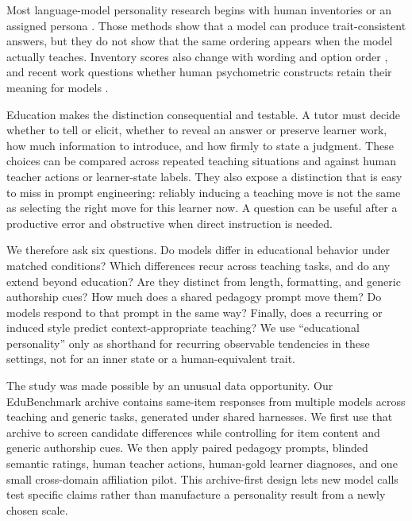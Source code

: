 \documentclass[11pt]{article}
\begin{document}
Most language-model personality research begins with human inventories or an
assigned persona \citep{jiang-etal-2024-personallm,lee-etal-2025-trait}. Those
methods show that a model can produce trait-consistent answers, but they do not
show that the same ordering appears when the model actually teaches. Inventory
scores also change with wording and option order \citep{shu-etal-2024-dont}, and
recent work questions whether human psychometric constructs retain their meaning
for models \citep{han-etal-2025-personality-illusion,zierahn-etal-2026-arent-human,contreras-2026-native-psychometric}.

Education makes the distinction consequential and testable. A tutor must decide
whether to tell or elicit, whether to reveal an answer or preserve learner work,
how much information to introduce, and how firmly to state a judgment. These
choices can be compared across repeated teaching situations and against human
teacher actions or learner-state labels. They also expose a distinction that is
easy to miss in prompt engineering: reliably inducing a teaching move is not the
same as selecting the right move for this learner now. A question can be useful
after a productive error and obstructive when direct instruction is needed.

We therefore ask six questions. Do models differ in educational behavior under
matched conditions? Which differences recur across teaching tasks, and do any
extend beyond education? Are they distinct from length, formatting, and generic
authorship cues? How much does a shared pedagogy prompt move them? Do models
respond to that prompt in the same way? Finally, does a recurring or induced
style predict context-appropriate teaching? We use ``educational personality''
only as shorthand for recurring observable tendencies in these settings, not
for an inner state or a human-equivalent trait.

The study was made possible by an unusual data opportunity. Our EduBenchmark
archive contains same-item responses from multiple models across teaching and
generic tasks, generated under shared harnesses. We first use that archive to
screen candidate differences while controlling for item content and generic
authorship cues. We then apply paired pedagogy prompts, blinded semantic ratings,
human teacher actions, human-gold learner diagnoses, and one small cross-domain
affiliation pilot. This archive-first design lets new model calls test specific
claims rather than manufacture a personality result from a newly chosen scale.
\end{document}
